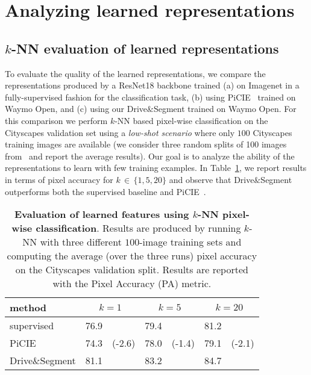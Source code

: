 \documentclass[runningheads]{llncs}
\newcommand{\ours}{Drive$\&$Segment\xspace}
\begin{document}
\section{Analyzing learned representations}

\subsection{$k$-NN evaluation of learned representations}
\label{sec:knn_eval}
To evaluate the quality of the learned representations, we compare the representations produced by a ResNet18 backbone trained (a) on Imagenet in a fully-supervised fashion for the classification task, 
(b) using PiCIE~\cite{cho2021picie} trained on Waymo Open, and (c) using our \ours trained on Waymo Open.
For this comparison we perform $k$-NN based pixel-wise classification on the Cityscapes validation set using a \emph{low-shot scenario} where only $100$ Cityscapes training images are available (we consider three random splits of 100 images from~\cite{french2020semi} and report the average results). 
Our goal is to analyze the ability of the representations to learn with few training examples.
In Table~\ref{tab:knn_eval_wDiff}, we report results in terms of pixel accuracy 
for $k\,{\in}\,\{1,5,20\}$ and observe that \ours outperforms both the supervised baseline and PiCIE~\cite{cho2021picie}.

\begin{table}[t]
    \centering
    \caption{\textbf{Evaluation of learned features using $k$-NN pixel-wise classification}. Results are produced by running $k$-NN with three different $100$-image training sets \cite{french2020semi} and computing the average (over the three runs) pixel accuracy on the Cityscapes validation split. Results are reported with the Pixel Accuracy (PA) metric.
    }
    \label{tab:knn_eval_wDiff}
    \begin{tabular}{l|cr|cr|cr}
    \toprule
    method & \multicolumn{2}{c|}{$k=1$} & \multicolumn{2}{c|}{$k=5$} & \multicolumn{2}{c}{$k=20$} \\
    \hline
    supervised & 76.9 & & 79.4 & & 81.2 & \\
    PiCIE~\cite{cho2021picie} & 74.3 & (-2.6) & 78.0 & (-1.4) & 79.1 & (-2.1) \\
    \ours & 81.1 & {\color{better}{(+4.2)}} & 83.2 & {\color{better}{(+3.8)}} & 84.7 & {\color{better}{(+3.5)}} \\
    \bottomrule
    \end{tabular}
\end{table}
\end{document}
